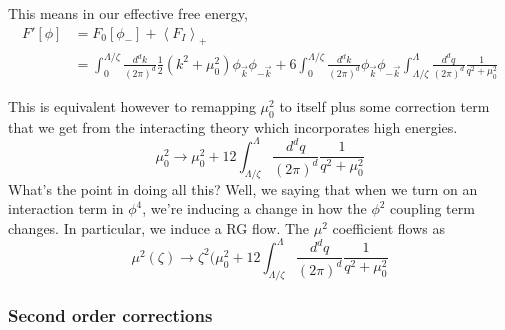 This means in our effective free energy, 
\begin{align*}
	F ' [ \phi ] &=  F_ 0 [ \phi _ - ] + \left<  F _ I \right>_+ \\
		     & = \int _ 0 ^{ \Lambda / \zeta } \frac{d ^ d k }{ ( 2 \pi ) ^ d } \frac{1}{2 } 
		     \left(  k ^ 2 + \mu _ 0 ^ 2  \right)  \phi_{ \vec{k} } \phi _{  - \vec{k} } + 6 \int ^{ \Lambda / \zeta } _ 0  \frac{d ^ d k }{ ( 2 \pi ) ^ d }
		     \phi_{ \vec{k} } \phi _{  - \vec{k} } 
		     \int _{ \Lambda / \zeta } ^ \Lambda 
		     \frac{ d ^ d q }{ ( 2 \pi ) ^ d } \frac{1}{ q ^ 2 + \mu_ 0 ^ 2 } 
\end{align*}

This is equivalent however to remapping $ \mu _ 0 ^ 2 $ to 
itself plus some correction term that 
we get from the interacting theory which incorporates high 
energies. 
\[
 \mu _ 0 ^ 2 \to \mu _ 0 ^ 2 + 12 \int_{ \Lambda / \zeta } ^ \Lambda 
 \frac{ d ^ d q }{ ( 2 \pi ) ^ d } \frac{1}{q ^ 2 + \mu _ 0 ^ 2 }
\] 
What's the point in doing all this? Well, 
we saying that when we turn on an interaction 
term in $ \phi ^ 4 $, we're inducing 
a change in how the $ \phi ^ 2 $ coupling term changes.
In particular, we induce a RG flow. The $ \mu ^ 2 $ 
coefficient flows as 
\[
 \mu ^ 2 ( \zeta ) \to \zeta ^ 2 ( \mu _ 0 ^ 2 + 12 \int_{ \Lambda / \zeta } ^ \Lambda 
 \frac{ d ^ d q }{ ( 2 \pi ) ^ d } \frac{1}{q ^ 2 + \mu _ 0 ^ 2 }
\]

\subsubsection{Second order corrections} 

